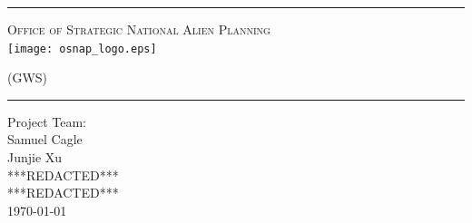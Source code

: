 \begin{titlepage}
\begin{center}

\rule{\linewidth}{0.5mm}

\textsc{\large Office of Strategic National Alien Planning}
~\\[1cm]
\texttt{[image: osnap\_logo.eps]}~\\[1cm]

{\Huge \linespread{2}}

\vspace{10pt}

\textsc{\Large (GWS)}

\rule{\linewidth}{0.5mm}

\vfill

Project Team:\\
Samuel Cagle\\
Junjie Xu\\
***REDACTED***\\
***REDACTED***\\

\vfill
{\large \today}

\end{center}
\end{titlepage}
